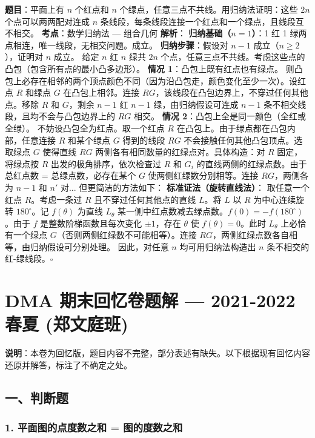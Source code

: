 \documentclass[10pt,a4paper,openany]{ctexbook}
\theoremstyle{definition}
\theoremstyle{remark}
\begin{document}
\textbf{题目}：平面上有 $n$ 个红点和 $n$ 个绿点，任意三点不共线。用归纳法证明：这些 $2n$ 个点可以两两配对连成 $n$ 条线段，每条线段连接一个红点和一个绿点，且线段互不相交。
\textbf{考点}：数学归纳法 — 组合几何
\textbf{解析}：
\textbf{归纳基础（$n=1$）}：1 红 1 绿两点相连，唯一线段，无相交问题。成立。
\textbf{归纳步骤}：假设对 $n-1$ 成立（$n \ge 2$），证明对 $n$ 成立。
给定 $n$ 红 $n$ 绿共 $2n$ 个点，任意三点不共线。考虑这些点的凸包（包含所有点的最小凸多边形）。
\textbf{情况 1}：凸包上既有红点也有绿点。
则凸包上必存在相邻的两个顶点颜色不同（因为沿凸包走，颜色变化至少一次）。设红点 $R$ 和绿点 $G$ 在凸包上相邻。连接 $RG$，该线段在凸包边界上，不穿过任何其他点。移除 $R$ 和 $G$，剩余 $n-1$ 红 $n-1$ 绿，由归纳假设可连成 $n-1$ 条不相交线段，且均不会与凸包边界上的 $RG$ 相交。
\textbf{情况 2}：凸包上全是同一颜色（全红或全绿）。
不妨设凸包全为红点。取一个红点 $R$ 在凸包上。由于绿点都在凸包内部，任意连接 $R$ 和某个绿点 $G$ 得到的线段 $RG$ 不会接触任何其他凸包顶点。选取绿点 $G$ 使得直线 $RG$ 两侧各有相同数量的红绿点对。具体构造：对 $R$ 固定，将绿点按 $R$ 出发的极角排序，依次检查过 $R$ 和 $G_i$ 的直线两侧的红绿点数。由于总红点数 = 总绿点数，必存在某个 $G$ 使两侧红绿数分别相等。连接 $RG$，两侧各为 $n-1$ 和 $n'$ 对... 但更简洁的方法如下：
\textbf{标准证法（旋转直线法）}：
取任意一个红点 $R$。考虑一条过 $R$ 且不穿过任何其他点的直线 $L$。将 $L$ 以 $R$ 为中心连续旋转 $180^\circ$。记 $f(\theta)$ 为直线 $L_\theta$ 某一侧中红点数减去绿点数。$f(0) = -f(180^\circ)$。由于 $f$ 是整数阶梯函数且每次变化 $\pm 1$，存在 $\theta$ 使 $f(\theta) = 0$。此时 $L_\theta$ 上必恰有一个绿点 $G$（否则两侧红绿数不可能相等）。连接 $RG$，两侧红绿点数各自相等，由归纳假设可分别处理。
因此，对任意 $n$ 均可用归纳法构造出 $n$ 条不相交的红-绿线段。$\square$
\vspace{-2pt}

\section{DMA 期末回忆卷题解 — 2021-2022 春夏 (郑文庭班)}

\textbf{说明}：本卷为回忆版，题目内容不完整，部分表述有缺失。以下根据现有回忆内容还原并解答，标注了不确定之处。
\vspace{-2pt}

\subsection{一、判断题}

\subsubsection{1. 平面图的点度数之和 = 图的度数之和}
\end{document}
